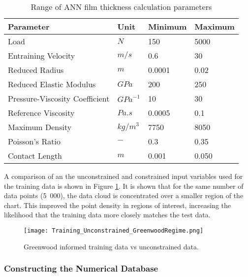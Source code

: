 \begin{table*}
	\caption{Range of ANN film thickness calculation parameters}
	\label{Range of ANN film thickness calculation parameters}
	\centering
	\renewcommand{\arraystretch}{1.5}%
	\begin{tabular}{|P{0.4\textwidth}|P{0.15\textwidth}|P{0.15\textwidth}|P{0.15\textwidth}|}
		\hline
		\textbf{Parameter} & \textbf{Unit} & \textbf{Minimum} & \textbf{Maximum} \\ [0.5ex]
		\hline
		Load & $N$ & 150 & 5000 \\ [0.5ex]
		\hline
		Entraining Velocity & $m/s$ & 0.6 & 30 \\ [0.5ex]
		\hline
		Reduced Radius & $m$ & 0.0001 & 0.02 \\ [0.5ex]
		\hline
		Reduced Elastic Modulus & $GPa$ & 200 & 250 \\ [0.5ex]
		\hline
		Pressure-Viscosity Coefficient & ${GPa}^{-1}$ & 10 & 30 \\ [0.5ex]
		\hline
		Reference Viscosity & $Pa.s$ & 0.0005 & 0.1 \\ [0.5ex]
		\hline
		Maximum Density & ${kg}/{m}^3$ & 7750 & 8050 \\ [0.5ex]
		\hline
		Poisson's Ratio & $-$ & 0.3 & 0.35 \\ [0.5ex]
		\hline
		Contact Length & $m$ & 0.001 & 0.050 \\ [0.5ex]
		\hline
		
	\end{tabular}
\end{table*}

A comparison of an the unconstrained and constrained input variables used for the training data is shown in Figure \ref{Training_Unconstrained_GreenwoodRegime}. It is shown that for the same number of data points (5~000), the data cloud is concentrated over a smaller region of the chart. This improved the point density in regions of interest, increasing the likelihood that the training data more closely matches the test data.

\begin{figure}
	\centering  
	\texttt{[image: Training\_Unconstrained\_GreenwoodRegime.png]}
	\caption{Greenwood informed training data vs unconstrained data.}
	\label{Training_Unconstrained_GreenwoodRegime}
\end{figure} 

\subsubsection{Constructing the Numerical Database}

